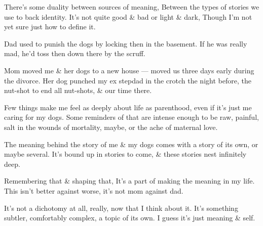 There's some duality between sources of meaning, Between the types of stories we use to back identity. It's not quite good \& bad or light \& dark, Though I'm not yet sure just how to define it.

Dad used to punish the dogs by locking then in the basement. If he was really mad, he'd toss then down there by the scruff.

Mom moved me \& her dogs to a new house --- moved us three days early during the divorce. Her dog punched my ex stepdad in the crotch the night before, the nut-shot to end all nut-shots, \& our time there.

Few things make me feel as deeply about life as parenthood, even if it's just me caring for my dogs. Some reminders of that are intense enough to be raw, painful, salt in the wounds of mortality, maybe, or the ache of maternal love.

The meaning behind the story of me \& my dogs comes with a story of its own, or maybe several. It's bound up in stories to come, \& these stories nest infinitely deep.

Remembering that \& shaping that, It's a part of making the meaning in my life. This isn't better against worse, it's not mom against dad.

It's not a dichotomy at all, really, now that I think about it. It's something subtler, comfortably complex, a topic of its own. I guess it's just meaning \& self.

